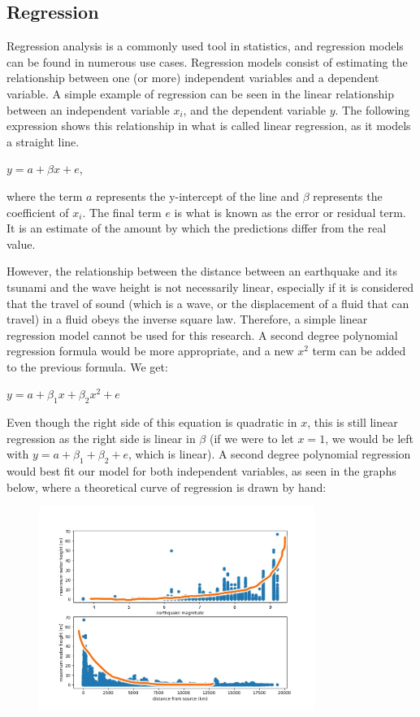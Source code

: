 \documentclass[11pt,letterpaper]{article}
\begin{document}
\subsection{Regression}

Regression analysis is a commonly used tool in statistics, and regression models can
be found in numerous use cases. Regression models consist of estimating the
relationship between one (or more) independent variables and a dependent variable. A
simple example of regression can be seen in the linear relationship between an independent
variable $x_{i}$, and the dependent variable $y$. The following expression shows this relationship in what is
called linear regression, as it models a straight line.

$y = a + \beta x + e $,

where the term $a$ represents the y-intercept of the line and $\beta$ represents the
coefficient of $x_i$. The final term $e$ is what is known as the error or residual
term. It is an estimate of the amount by which the predictions differ from the real
value.

However, the relationship between the distance between an earthquake and its tsunami 
and the wave height is not necessarily linear, especially if it is considered that the travel of
sound (which is a wave, or the displacement of a fluid that can travel) in a fluid obeys the 
inverse square law. Therefore, a simple linear regression model cannot be 
used for this research. A second degree polynomial regression formula would be more 
appropriate, and a new $x^2$ term can be added to the previous formula. We get:

$y = a + \beta_1 x + \beta_2 x^2 + e$

Even though the right side of this equation is quadratic in $x$, this is still
linear regression as the right side is linear in $\beta$ (if we were to let
$x = 1$, we would be left with $y = a + \beta_1 + \beta_2 + e$, which is linear).
A second degree polynomial regression would best fit our model for both independent
variables, as seen in the graphs below, where a theoretical curve of regression is drawn
by hand:

\begin{figure}[h]
    \centering
    \includegraphics[width=0.8\textwidth]{modelshowcase.jpeg}
    \label{fig:boat1}
\end{figure}
\end{document}
